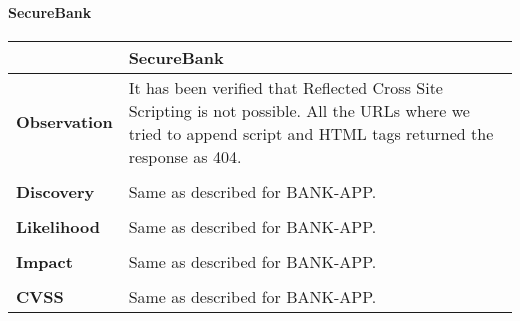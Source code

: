 \paragraph{SecureBank} \mbox{}
\begin{longtable*}{p{.20\textwidth} | p{.80\textwidth}}
    \hline
    & \textbf{SecureBank} \\
    \hline
    \textbf{Observation} &
        It has been verified that Reflected Cross Site Scripting is not possible. All the URLs where we tried to append script and HTML tags returned the response as 404.
    \\\\
    \textbf{Discovery} &
    	Same as described for BANK-APP.
    \\\\ 
    \textbf{Likelihood} &
        Same as described for BANK-APP.
    \\\\
    \textbf{Impact} &
        Same as described for BANK-APP.
    \\\\
    \textbf{CVSS} &
        Same as described for BANK-APP.
    \\
    \hline
\end{longtable*}
\clearpage